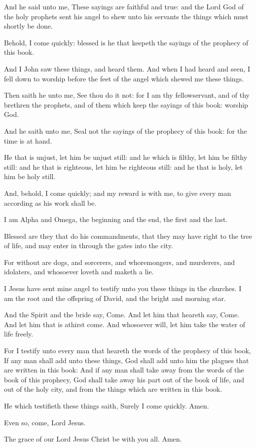 \verse And he said unto me, These sayings are faithful and true: and the Lord God of the holy prophets sent his angel to shew unto his servants the things which must shortly be done.

\verse Behold, I come quickly: blessed is he that keepeth the sayings of the prophecy of this book.

\verse And I John saw these things, and heard them. And when I had heard and seen, I fell down to worship before the feet of the angel which shewed me these things.

\verse Then saith he unto me, See thou do it not: for I am thy fellowservant, and of thy brethren the prophets, and of them which keep the sayings of this book: worship God.

\verse And he saith unto me, Seal not the sayings of the prophecy of this book: for the time is at hand.

\verse He that is unjust, let him be unjust still: and he which is filthy, let him be filthy still: and he that is righteous, let him be righteous still: and he that is holy, let him be holy still.

\verse And, behold, I come quickly; and my reward is with me, to give every man according as his work shall be.

\verse I am Alpha and Omega, the beginning and the end, the first and the last.

\verse Blessed are they that do his commandments, that they may have right to the tree of life, and may enter in through the gates into the city.

\verse For without are dogs, and sorcerers, and whoremongers, and murderers, and idolaters, and whosoever loveth and maketh a lie.

\verse I Jesus have sent mine angel to testify unto you these things in the churches. I am the root and the offspring of David, and the bright and morning star.

\verse And the Spirit and the bride say, Come. And let him that heareth say, Come. And let him that is athirst come. And whosoever will, let him take the water of life freely.

\verse For I testify unto every man that heareth the words of the prophecy of this book, If any man shall add unto these things, God shall add unto him the plagues that are written in this book: \verse And if any man shall take away from the words of the book of this prophecy, God shall take away his part out of the book of life, and out of the holy city, and from the things which are written in this book.

\verse He which testifieth these things saith, Surely I come quickly.  Amen.

Even so, come, Lord Jesus.

\verse The grace of our Lord Jesus Christ be with you all. Amen.

